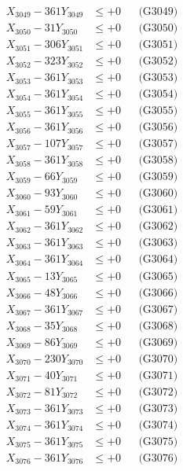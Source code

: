 \documentclass[a4paper,10pt]{article}
\begin{document}
{\begin{align}
X_{3049} - 361Y_{3049} &\leq +0 && \text{(G3049)} \\
X_{3050} - 31Y_{3050} &\leq +0 && \text{(G3050)} \\
\allowbreak
X_{3051} - 306Y_{3051} &\leq +0 && \text{(G3051)} \\
X_{3052} - 323Y_{3052} &\leq +0 && \text{(G3052)} \\
X_{3053} - 361Y_{3053} &\leq +0 && \text{(G3053)} \\
X_{3054} - 361Y_{3054} &\leq +0 && \text{(G3054)} \\
X_{3055} - 361Y_{3055} &\leq +0 && \text{(G3055)} \\
X_{3056} - 361Y_{3056} &\leq +0 && \text{(G3056)} \\
X_{3057} - 107Y_{3057} &\leq +0 && \text{(G3057)} \\
X_{3058} - 361Y_{3058} &\leq +0 && \text{(G3058)} \\
X_{3059} - 66Y_{3059} &\leq +0 && \text{(G3059)} \\
X_{3060} - 93Y_{3060} &\leq +0 && \text{(G3060)} \\
\allowbreak
X_{3061} - 59Y_{3061} &\leq +0 && \text{(G3061)} \\
X_{3062} - 361Y_{3062} &\leq +0 && \text{(G3062)} \\
X_{3063} - 361Y_{3063} &\leq +0 && \text{(G3063)} \\
X_{3064} - 361Y_{3064} &\leq +0 && \text{(G3064)} \\
X_{3065} - 13Y_{3065} &\leq +0 && \text{(G3065)} \\
X_{3066} - 48Y_{3066} &\leq +0 && \text{(G3066)} \\
X_{3067} - 361Y_{3067} &\leq +0 && \text{(G3067)} \\
X_{3068} - 35Y_{3068} &\leq +0 && \text{(G3068)} \\
X_{3069} - 86Y_{3069} &\leq +0 && \text{(G3069)} \\
X_{3070} - 230Y_{3070} &\leq +0 && \text{(G3070)} \\
\allowbreak
X_{3071} - 40Y_{3071} &\leq +0 && \text{(G3071)} \\
X_{3072} - 81Y_{3072} &\leq +0 && \text{(G3072)} \\
X_{3073} - 361Y_{3073} &\leq +0 && \text{(G3073)} \\
X_{3074} - 361Y_{3074} &\leq +0 && \text{(G3074)} \\
X_{3075} - 361Y_{3075} &\leq +0 && \text{(G3075)} \\
X_{3076} - 361Y_{3076} &\leq +0 && \text{(G3076)} \\

\end{align}}
\end{document}
